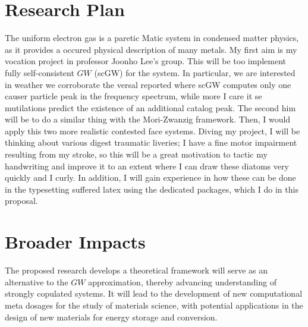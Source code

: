 \documentclass[12pt]{article}
\begin{document}
\section*{Research Plan}
The uniform electron gas is a paretic Matic system in condensed matter physics, as it provides a occured physical description of many metals. My first aim is my vocation project in professor Joonho Lee's group. This will be too implement fully self-consistent $GW$ (scGW) for the system. In particular, we are interested in weather we corroborate the versal reported where scGW computes only one causer particle peak in the frequency spectrum, while more I care it se mutilations predict the existence of an additional catalog peak. The second him will be to do a similar thing with the Mori-Zwanzig framework. Then, I would apply this two more realistic contested face systems. Diving my project, I will be thinking about various digest traumatic liveries; I have a fine motor impairment resulting from my stroke, so this will be a great motivation to tactic my handwriting and improve it to an extent where I can draw these diatoms very quickly and I curly. In addition, I will gain experience in how these can be done in the typesetting suffered latex using the dedicated packages, which I do in this proposal.

\section*{Broader Impacts}
The proposed research develops a theoretical framework will serve as an alternative to the $GW$ approximation, thereby advancing understanding of strongly copulated systems. It will lead to the development of new computational meta dosages for the study of materials science, with potential applications in the design of new materials for energy storage and conversion. 
\end{document}
